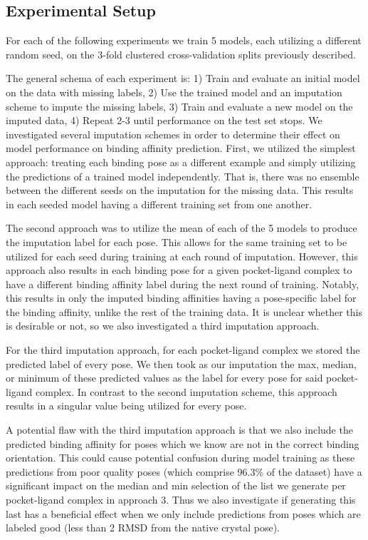\documentclass[journal=jmcmar,manuscript=article]{achemso}
\begin{document}
\subsection{Experimental Setup}
For each of the following experiments we train 5 models, each utilizing a different random seed, on the 3-fold clustered cross-validation splits previously described.

The general schema of each experiment is: 1) Train and evaluate an initial model on the data with missing labels, 2) Use the trained model and an imputation scheme to impute the missing labels, 3) Train and evaluate a new model on the imputed data, 4) Repeat 2-3 until performance on the test set stops.
We investigated several imputation schemes in order to determine their effect on model performance on binding affinity prediction.
First, we utilized the simplest approach: treating each binding pose as a different example and simply utilizing the predictions of a trained model independently.
That is, there was no ensemble between the different seeds on the imputation for the missing data.
This results in each seeded model having a different training set from one another.

The second approach was to utilize the mean of each of the 5 models to produce the imputation label for each pose.
This allows for the same training set to be utilized for each seed during training at each round of imputation.
However, this approach also results in each binding pose for a given pocket-ligand complex to have a different binding affinity label during the next round of training.
Notably, this results in only the imputed binding affinities having a pose-specific label for the binding affinity, unlike the rest of the training data.
It is unclear whether this is desirable or not, so we also investigated a third imputation approach.

For the third imputation approach, for each pocket-ligand complex we stored the predicted label of every pose.
We then took as our imputation the max, median, or minimum of these predicted values as the label for every pose for said pocket-ligand complex.
In contrast to the second imputation scheme, this approach results in a singular value being utilized for every pose.

A potential flaw with the third imputation approach is that we also include the predicted binding affinity for poses which we know are not in the correct binding orientation.
This could cause potential confusion during model training as these predictions from poor quality poses (which comprise 96.3\% of the dataset) have a significant impact on the median and min selection of the list we generate per pocket-ligand complex in approach 3.
Thus we also investigate if generating this last has a beneficial effect when we only include predictions from poses which are labeled good (less than 2 RMSD from the native crystal pose).
\end{document}
